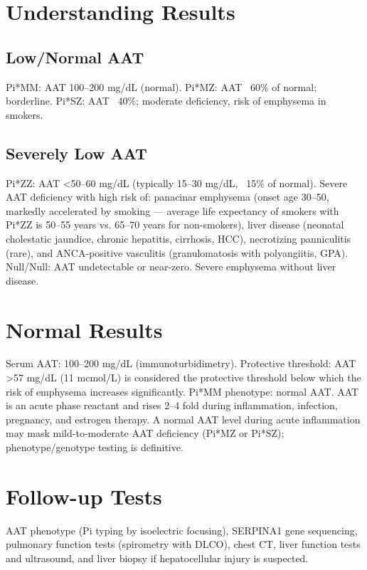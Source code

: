 \section*{Understanding Results}
\subsection*{Low/Normal AAT}
Pi*MM: AAT 100--200 mg/dL (normal). Pi*MZ: AAT ~60\% of normal; borderline. Pi*SZ: AAT ~40\%; moderate deficiency, risk of emphysema in smokers.
\subsection*{Severely Low AAT}
Pi*ZZ: AAT <50--60 mg/dL (typically 15--30 mg/dL, ~15\% of normal). Severe AAT deficiency with high risk of: panacinar emphysema (onset age 30--50, markedly accelerated by smoking --- average life expectancy of smokers with Pi*ZZ is 50--55 years vs. 65--70 years for non-smokers), liver disease (neonatal cholestatic jaundice, chronic hepatitis, cirrhosis, HCC), necrotizing panniculitis (rare), and ANCA-positive vasculitis (granulomatosis with polyangiitis, GPA). Null/Null: AAT undetectable or near-zero. Severe emphysema without liver disease.
\section*{Normal Results}
Serum AAT: 100--200 mg/dL (immunoturbidimetry). Protective threshold: AAT >57 mg/dL (11 mcmol/L) is considered the protective threshold below which the risk of emphysema increases significantly. Pi*MM phenotype: normal AAT. AAT is an acute phase reactant and rises 2--4 fold during inflammation, infection, pregnancy, and estrogen therapy. A normal AAT level during acute inflammation may mask mild-to-moderate AAT deficiency (Pi*MZ or Pi*SZ); phenotype/genotype testing is definitive.
\section*{Follow-up Tests}
AAT phenotype (Pi typing by isoelectric focusing), SERPINA1 gene sequencing, pulmonary function tests (spirometry with DLCO), chest CT, liver function tests and ultrasound, and liver biopsy if hepatocellular injury is suspected.
